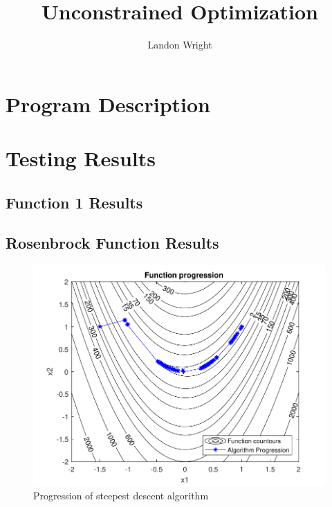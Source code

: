 \documentclass{article}
\newcommand{\wide}{0.9\linewidth}
\begin{document}
\title{Unconstrained Optimization}
\author{Landon Wright}
\maketitle
\section{Program Description}
\section{Testing Results}
\subsection{Function 1 Results}




\subsection{Rosenbrock Function Results}
\begin{figure}[h]
  \centering
  \includegraphics[width=\wide]{progression1.pdf}
  \caption{Progression of steepest descent algorithm}
  \label{fig:steepest}
\end{figure}
\end{document}
